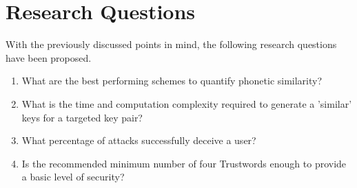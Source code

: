 \section{Research Questions}

With the previously discussed points in mind, the following research questions have been proposed.

\begin{enumerate}
    \item  What are the best performing schemes to quantify phonetic similarity?  \label{goal:phoneticSimilarity}

    \item What is the time and computation complexity required to generate a 'similar' keys for a targeted key pair? \label{goal:complexity}
    
    \item What percentage of attacks successfully deceive a user? \label{goal:attackPercentage}

    \item Is the recommended minimum number of four Trustwords enough to provide a basic level of security? \label{goal:numberOfTrustwords}
\end{enumerate}
